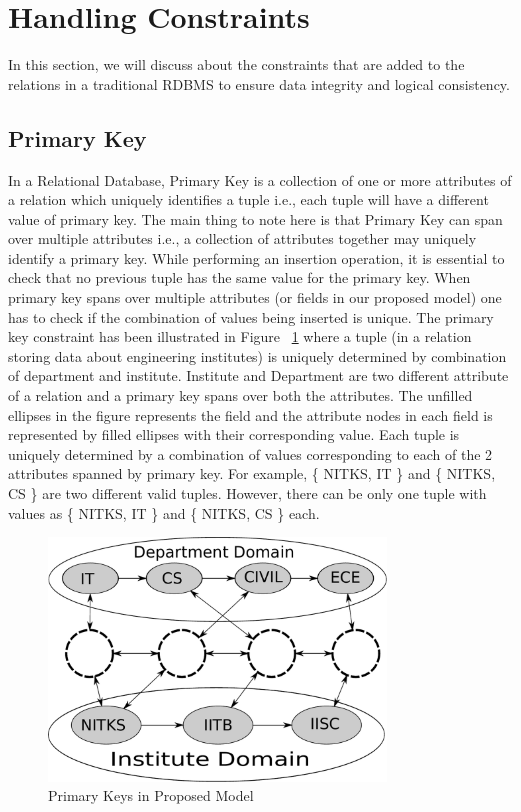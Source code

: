 \documentclass[12pt, oneside]{book}
\begin{document}
\section{Handling Constraints}
In this section, we will discuss about the constraints that are added to the relations in a traditional RDBMS to ensure data integrity and logical consistency.
\subsection{Primary Key}
In a Relational Database, Primary Key is a collection of one or more attributes of a relation which uniquely identifies a tuple i.e., each tuple will have a different value of primary key. The main thing to note here is that Primary Key can span over multiple attributes i.e., a collection of attributes together may uniquely identify a primary key. While performing an insertion operation, it is essential to check that no previous tuple has the same value for the primary key. When primary key spans over multiple attributes (or fields in our proposed model) one has to check if the combination of values being inserted is unique. The primary key constraint has been illustrated in Figure ~\ref{fig:primary_key} where a tuple (in a relation storing data about engineering institutes) is uniquely determined by combination of department and institute. Institute and Department are two different attribute of a relation and a primary key spans over both the attributes. The unfilled ellipses in the figure represents the field and the attribute nodes in each field is represented by filled ellipses with their corresponding value. Each tuple is uniquely determined by a combination of values corresponding to each of the 2 attributes spanned by primary key. For example, \{ NITKS, IT \} and \{ NITKS, CS \} are two different valid tuples. However, there can be only one tuple with values as \{ NITKS, IT \} and \{ NITKS, CS \} each.
\begin{figure}
 \centering
 \includegraphics[width=0.8\textwidth]{pics/primary_key.pdf}
 \caption{Primary Keys in Proposed Model}
 \label{fig:primary_key}
\end{figure}
\end{document}
